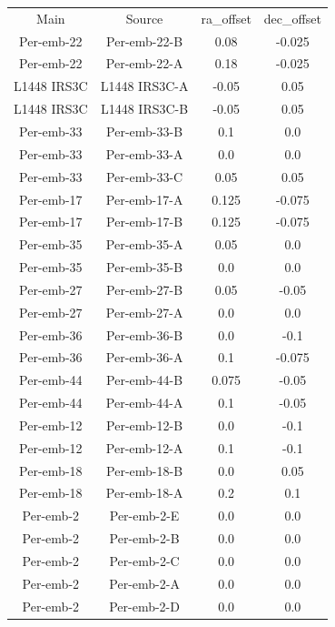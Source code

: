\begin{deluxetable}
\begin{tabular}{cccc}
Main & Source & ra_offset & dec_offset \\
Per-emb-22 & Per-emb-22-B & 0.08 & -0.025 \\
Per-emb-22 & Per-emb-22-A & 0.18 & -0.025 \\
L1448 IRS3C & L1448 IRS3C-A & -0.05 & 0.05 \\
L1448 IRS3C & L1448 IRS3C-B & -0.05 & 0.05 \\
Per-emb-33 & Per-emb-33-B & 0.1 & 0.0 \\
Per-emb-33 & Per-emb-33-A & 0.0 & 0.0 \\
Per-emb-33 & Per-emb-33-C & 0.05 & 0.05 \\
Per-emb-17 & Per-emb-17-A & 0.125 & -0.075 \\
Per-emb-17 & Per-emb-17-B & 0.125 & -0.075 \\
Per-emb-35 & Per-emb-35-A & 0.05 & 0.0 \\
Per-emb-35 & Per-emb-35-B & 0.0 & 0.0 \\
Per-emb-27 & Per-emb-27-B & 0.05 & -0.05 \\
Per-emb-27 & Per-emb-27-A & 0.0 & 0.0 \\
Per-emb-36 & Per-emb-36-B & 0.0 & -0.1 \\
Per-emb-36 & Per-emb-36-A & 0.1 & -0.075 \\
Per-emb-44 & Per-emb-44-B & 0.075 & -0.05 \\
Per-emb-44 & Per-emb-44-A & 0.1 & -0.05 \\
Per-emb-12 & Per-emb-12-B & 0.0 & -0.1 \\
Per-emb-12 & Per-emb-12-A & 0.1 & -0.1 \\
Per-emb-18 & Per-emb-18-B & 0.0 & 0.05 \\
Per-emb-18 & Per-emb-18-A & 0.2 & 0.1 \\
Per-emb-2 & Per-emb-2-E & 0.0 & 0.0 \\
Per-emb-2 & Per-emb-2-B & 0.0 & 0.0 \\
Per-emb-2 & Per-emb-2-C & 0.0 & 0.0 \\
Per-emb-2 & Per-emb-2-A & 0.0 & 0.0 \\
Per-emb-2 & Per-emb-2-D & 0.0 & 0.0 \\
\end{tabular}
\end{deluxetable}

